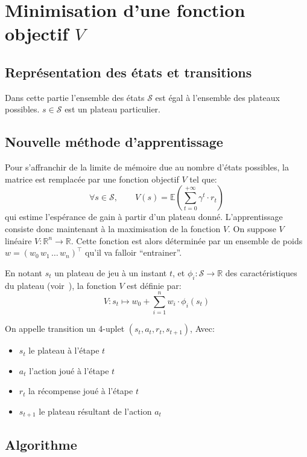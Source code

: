 \documentclass{report}
\newcommand{\R}{\mathbb{R}}
\begin{document}
\chapter{Minimisation d'une fonction objectif \( V \)}

\section{Représentation des états et transitions}

Dans cette partie l'ensemble des états \( \mathcal{S} \) est égal à l'ensemble
des plateaux possibles. \( s \in \mathcal{S} \) est un plateau particulier.

\section{Nouvelle méthode d'apprentissage}

Pour s'affranchir de la limite de mémoire due au nombre d'états possibles, la
matrice est remplacée par une fonction objectif \( V \) tel que:
\[
  \forall s \in \mathcal{S}, \qquad V(s) =
  \mathbb{E}\left(\sum_{t=0}^{+\infty} \gamma ^t \cdot r_t\right)
\]
qui estime l'espérance de gain à partir d'un plateau donné.
L'apprentissage consiste donc maintenant à la maximisation de la
fonction \( V \).
On suppose \( V \) linéaire \(V \colon \R^n \to \R\). Cette fonction est alors
déterminée par un ensemble de poids \(w = (w_0\, w_1\, \dots\, w_n)^\top\)
qu'il va falloir ``entrainer''.

En notant \( s_t \) un plateau de jeu à un instant \( t \), et
\(\phi_i\colon \mathcal{S} \to \R\) des caractéristiques du plateau
(voir~\cite{boumaza13}), la fonction \(V\)
est définie par:
\[
  V \colon s_t \mapsto w_0 + \sum_{i=1}^n w_i \cdot \phi_i (s_t)
\]

On appelle transition un 4-uplet \( (s_t, a_t, r_t, s_{t+1}) \), Avec:
\begin{itemize}
    \item \( s_t \) le plateau à l'étape \( t \)
    \item \( a_t \) l'action joué à l'étape \( t \)
    \item \( r_t \) la récompense joué à l'étape \( t \)
    \item \( s_{t+1} \) le plateau résultant de l'action \( a_t \)
\end{itemize}


\section{Algorithme}
\end{document}
